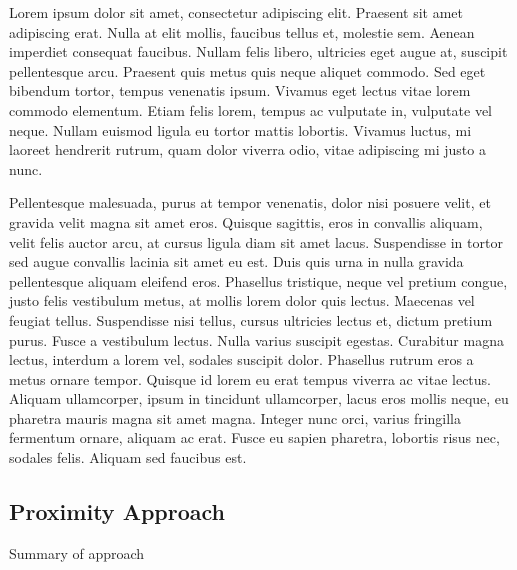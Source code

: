 \documentclass[preprint,5p,times,twocolumn]{elsarticle}
\begin{document}
Lorem ipsum dolor sit amet, consectetur adipiscing elit. Praesent sit amet
adipiscing erat. Nulla at elit mollis, faucibus tellus et, molestie sem. Aenean
imperdiet consequat faucibus. Nullam felis libero, ultricies eget augue at,
suscipit pellentesque arcu. Praesent quis metus quis neque aliquet commodo. Sed
eget bibendum tortor, tempus venenatis ipsum. Vivamus eget lectus vitae lorem
commodo elementum. Etiam felis lorem, tempus ac vulputate in, vulputate vel
neque. Nullam euismod ligula eu tortor mattis lobortis. Vivamus luctus, mi
laoreet hendrerit rutrum, quam dolor viverra odio, vitae adipiscing mi justo a
nunc.

Pellentesque malesuada, purus at tempor venenatis, dolor nisi posuere velit, et
gravida velit magna sit amet eros. Quisque sagittis, eros in convallis aliquam,
velit felis auctor arcu, at cursus ligula diam sit amet lacus. Suspendisse in
tortor sed augue convallis lacinia sit amet eu est. Duis quis urna in nulla
gravida pellentesque aliquam eleifend eros. Phasellus tristique, neque vel
pretium congue, justo felis vestibulum metus, at mollis lorem dolor quis
lectus. Maecenas vel feugiat tellus. Suspendisse nisi tellus, cursus ultricies
lectus et, dictum pretium purus. Fusce a vestibulum lectus. Nulla varius
suscipit egestas. Curabitur magna lectus, interdum a lorem vel, sodales
suscipit dolor. Phasellus rutrum eros a metus ornare tempor. Quisque id lorem
eu erat tempus viverra ac vitae lectus. Aliquam ullamcorper, ipsum in tincidunt
ullamcorper, lacus eros mollis neque, eu pharetra mauris magna sit amet magna.
Integer nunc orci, varius fringilla fermentum ornare, aliquam ac erat. Fusce eu
sapien pharetra, lobortis risus nec, sodales felis. Aliquam sed faucibus est.

\subsection{Proximity Approach}
\label{process:proximity}

Summary of approach

\begin{center}
\end{center}
\end{document}
